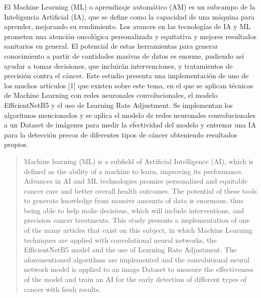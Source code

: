\begin{resumen}
	El Machine Learning (ML) o aprendizaje automático (AM) es un subcampo de la Inteligencia Artificial (IA),
que se define como la capacidad de una máquina para aprender, mejorando su rendimiento. Los avances en
las tecnologías de IA y ML prometen una atención oncológica personalizada y equitativa y mejores resultados
sanitarios en general. El potencial de estas herramientas para generar conocimiento a partir de cantidades masivas
de datos es enorme, pudiendo así ayudar a tomar decisiones, que incluirán intervenciones, y tratamientos
de precisión contra el cáncer. Este estudio presenta una implementación de uno de los muchos artículos [1] que
existen sobre este tema, en el que se aplican técnicas de Machine Learning con redes neuronales convolucionales,
el modelo EfficientNetB5 y el uso de Learning Rate Adjustment. Se implementan los algoritmos mencionados y
se aplica el modelo de redes neuronales convolucionales a un Dataset de imágenes para medir la efectividad del
modelo y entrenar una IA para la detección precoz de diferentes tipos de cáncer obteniendo resultados propios.
\end{resumen}

\begin{abstract}
	Machine learning (ML) is a subfield of Artificial Intelligence (AI), which is defined as the ability of a machine
to learn, improving its performance. Advances in AI and ML technologies promise personalized and equitable
cancer care and better overall health outcomes. The potential of these tools to generate knowledge from massive
amounts of data is enormous, thus being able to help make decisions, which will include interventions, and
precision cancer treatments. This study presents a implementation of one of the many articles that exist on
this subject, in which Machine Learning techniques are applied with convolutional neural networks, 
the EfficientNetB5 model and the use of Learning Rate Adjustment. The aforementioned algorithms are implemented
and the convolutional neural network model is applied to an image Dataset to measure the effectiveness of the
model and train an AI for the early detection of different types of cancer with fresh results.
\end{abstract}